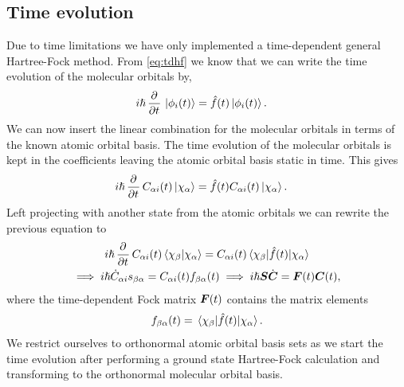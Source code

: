         \subsection{Time evolution}
            Due to time limitations we have only implemented a time-dependent
            general Hartree-Fock method.
            From \autoref{eq:tdhf} we know that we can write the time evolution
            of the molecular orbitals by,
            \begin{align}
                i\hslash\dpd{}{t}\ket*{\phi_i(t)}
                &= \fock(t)\ket*{\phi_i(t)}.
            \end{align}
            We can now insert the linear combination for the molecular orbitals in
            terms of the known atomic orbital basis.
            The time evolution of the molecular orbitals is kept in the
            coefficients leaving the atomic orbital basis static in time.
            This gives
            \begin{align}
                i\hslash\dpd{}{t}C_{\alpha i}(t)\ket*{\chi_{\alpha}}
                &= \fock(t)C_{\alpha i}(t)\ket*{\chi_{\alpha}}.
            \end{align}
            Left projecting with another state from the atomic orbitals we can rewrite
            the previous equation to
            \begin{gather}
                i\hslash\dpd{}{t}C_{\alpha i}(t)\braket*{\chi_{\beta}}{\chi_{\alpha}}
                =
                C_{\alpha i}(t)\mel*{\chi_{\beta}}{\fock(t)}{\chi_{\alpha}}
                \\
                \implies
                i\hslash \dot{C}_{\alpha i} \overlapten_{\beta\alpha}
                = C_{\alpha i}(t)\fockten_{\beta\alpha}(t)
                \implies
                i\hslash \vf{S}\dot{\vf{C}}
                = \fockmat(t)\vf{C}(t),
                \label{eq:tdhf-equations}
            \end{gather}
            where the time-dependent Fock matrix $\boldsymbol{F}(t)$ contains the
            matrix elements
            \begin{align}
                f_{\beta\alpha}(t)
                = \mel*{\chi_{\beta}}{\hat{f}(t)}{\chi_\alpha}.
            \end{align}
            We restrict ourselves to orthonormal atomic orbital basis sets as we
            start the time evolution after performing a ground state
            Hartree-Fock calculation and transforming to the orthonormal
            molecular orbital basis.
